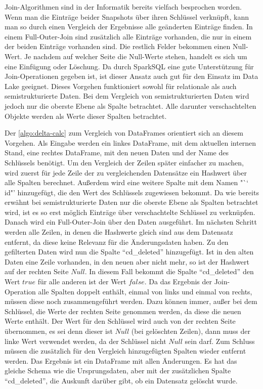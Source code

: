 Join-Algorithmen sind in der Informatik bereits vielfach besprochen worden.
Wenn man die Einträge beider Snapshots über ihren Schlüssel verknüpft, kann man so durch einen Vergleich der Ergebnisse alle geänderten Einträge finden.
In einem Full-Outer-Join sind zusätzlich alle Einträge vorhanden, die nur in einem der beiden Einträge vorhanden sind.
Die restlich Felder bekommen einen Null-Wert.
Je nachdem auf welcher Seite die Null-Werte stehen, handelt es sich um eine Einfügung oder Löschung.
Da durch SparkSQL eine gute Unterstützung für Join-Operationen gegeben ist, ist dieser Ansatz auch gut für den Einsatz im Data Lake geeignet.
Dieses Vorgehen funktioniert sowohl für relationale als auch semistrukturierte Daten.
Bei dem Vergleich von semistrukturierten Daten wird jedoch nur die oberste Ebene als Spalte betrachtet.
Alle darunter verschachtelten Objekte werden als Werte dieser Spalten betrachtet.

Der \cref{algo:delta-calc} zum Vergleich von DataFrames orientiert sich an diesem Vorgehen.
Als Eingabe werden ein linkes DataFrame, mit dem aktuellen internen Stand, eine rechtes DataFrame, mit den neuen Daten und der Name des Schlüssels benötigt.
Um den Vergleich der Zeilen später einfacher zu machen, wird zuerst für jede Zeile der zu vergleichenden Datensätze ein Hashwert über alle Spalten berechnet.
Außerdem wird eine weitere Spalte mit dem Namen "`\char`~ id"' hinzugefügt, die den Wert des Schlüssels zugewiesen bekommt.
Da wie bereits erwähnt bei semistrukturierte Daten nur die oberste Ebene als Spalten betrachtet wird, ist es so erst möglich  Einträge über verschachtelte Schlüssel zu verknüpfen.
Danach wird ein Full-Outer-Join über den Daten ausgeführt.
Im nächsten Schritt werden alle Zeilen, in denen die Hashwerte gleich sind aus dem Datensatz entfernt, da diese keine Relevanz für die Änderungsdaten haben.
Zu den gefilterten Daten wird nun die Spalte "`cd\_deleted"' hinzugefügt.
Ist in den alten Daten eine Zeile vorhanden, in den neuen aber nicht mehr, so ist der Hashwert auf der rechten Seite $Null$.
In diesem Fall bekommt die Spalte "`cd\_deleted"' den Wert $true$ für alle anderen ist der Wert $false$.
Da das Ergebnis der Join-Operation alle Spalten doppelt enthält, einmal von links und einmal von rechts, müssen diese noch zusammengeführt werden.
Dazu können immer, außer bei dem Schlüssel, die Werte der rechten Seite genommen werden, da diese die neuen Werte enthält.
Der Wert für den Schlüssel wird auch von der rechten Seite übernommen, es sei denn dieser ist $Null$ (bei gelöschten Zeilen), dann muss der linke Wert verwendet werden, da der Schlüssel nicht $Null$ sein darf.
Zum Schluss müssen die zusätzlich für den Vergleich hinzugefügten Spalten wieder entfernt werden.
Das Ergebnis ist ein DataFrame mit allen Änderungen.
Es hat das gleiche Schema wie die Ursprungsdaten, aber mit der zusätzlichen Spalte "`cd\_deleted"', die Auskunft darüber gibt, ob ein Datensatz gelöscht wurde.

